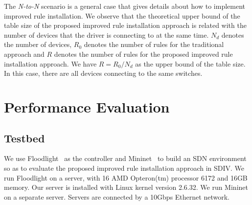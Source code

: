 \documentclass[journal]{IEEEtran}
\begin{document}
The \textit{N-to-N} scenario is a general case that gives details about how to implement improved rule installation. We observe that the theoretical upper bound of the table size of the proposed improved rule installation approach is related with the number of devices that the driver is connecting to at the same time. $N_{d}$ denotes the number of devices, $R_{0}$ denotes the number of rules for the traditional approach and $R$ denotes the number of rules for the proposed improved rule installation approach. We have $R = R_{0}/N_{d}$ as the upper bound of the table size. In this case, there are all devices connecting to the same switches.

%
%




\section{Performance Evaluation} \label{Evaluation}

\subsection{Testbed}

We use Floodlight~\cite{Floodlight} as the controller and Mininet~\cite{mininet} to build an SDN environment so as to evaluate the proposed improved rule installation approach in SDIV. We run Floodlight on a server, with 16 AMD Opteron(tm) processor 6172 and 16GB memory. Our server is installed with Linux kernel version 2.6.32. We run Mininet on a separate server. Servers are connected by a 10Gbps Ethernet network.
\end{document}
